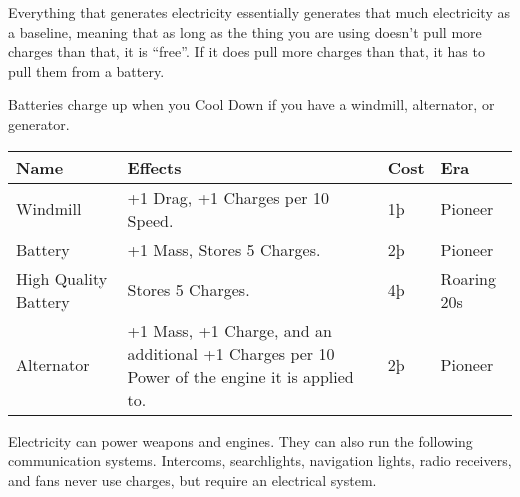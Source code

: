 \documentclass{article}
\begin{document}
Everything that generates electricity essentially generates that much
electricity as a baseline, meaning that as long as the thing you are
using doesn't pull more charges than that, it is ``free''. If it does
pull more charges than that, it has to pull them from a battery.

\hfill\break
Batteries charge up when you Cool Down if you have a windmill,
alternator, or generator.

\begin{tabular}{|l|l|l|l|}
    \hline
    Name                                  & Effects                                                 & Cost    & Era         \\\hline
    Windmill                              & +1 Drag, +1 Charges per 10 Speed.                       & 1þ      & Pioneer     \\\hline
    Battery                               & +1 Mass, Stores 5 Charges.                              & 2þ      & Pioneer     \\\hline
    High Quality Battery                  & Stores 5 Charges.                                       & 4þ      & Roaring 20s \\\hline
    Alternator                            & +1 Mass, +1 Charge, and an additional +1 Charges per 10
    Power of the engine it is applied to. & 2þ                                                      & Pioneer               \\\hline
\end{tabular}

Electricity can power weapons and engines. They can also run the
following communication systems. Intercoms, searchlights, navigation
lights, radio receivers, and fans never use charges, but require an
electrical system.
\end{document}
